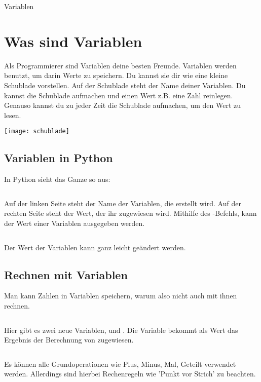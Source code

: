 \documentclass{\VorlagenPfad/coderdojokatext}
\newcommand{\Titel}{Variablen}
\begin{document}
\begin{center}
	{\huge \Titel}
\end{center}

\section{Was sind Variablen}
Als Programmierer sind Variablen deine besten Freunde. Variablen werden benutzt, um darin Werte zu speichern. Du kannst sie dir wie eine kleine Schublade vorstellen. Auf der Schublade steht der Name deiner Variablen. Du kannst die Schublade aufmachen und einen Wert z.B. eine Zahl reinlegen. Genauso kannst du zu jeder Zeit die Schublade aufmachen, um den Wert zu lesen.

\begin{center}
\texttt{[image: schublade]}
\end{center}

\subsection{Variablen in Python}
In Python sieht das Ganze so aus:

\inputminted[firstline=1, lastline=4]{python}{../../../Beispiele/variablen.py}

Auf der linken Seite steht der Name der Variablen, die erstellt wird. Auf der rechten Seite steht der Wert, der ihr zugewiesen wird.
Mithilfe des -Befehls, kann der Wert einer Variablen ausgegeben werden.


\inputminted[firstline=7, lastline=8]{python}{../../../Beispiele/variablen.py}
Der Wert der Variablen kann ganz leicht geändert werden.

\subsection{Rechnen mit Variablen}
Man kann Zahlen in Variablen speichern, warum also nicht auch mit ihnen rechnen.
\inputminted[firstline=11, lastline=15]{python}{../../../Beispiele/variablen.py}

Hier gibt es zwei neue Variablen,  und . Die Variable  bekommt als Wert das Ergebnis der Berechnung von  zugewiesen.

\inputminted[firstline=16, lastline=21]{python}{../../../Beispiele/variablen.py}
Es können alle Grundoperationen wie Plus, Minus, Mal, Geteilt verwendet werden. Allerdings sind hierbei Rechenregeln wie 'Punkt vor Strich' zu beachten.
\end{document}
